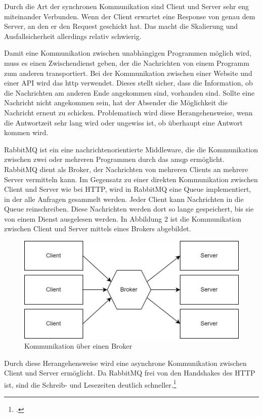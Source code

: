Durch die Art der synchronen Kommunikation sind Client und Server sehr eng miteinander Verbunden. Wenn der Client erwartet eine Response von genau dem Server, an den er den Request geschickt hat. Das macht die Skalierung und Ausfallsicherheit allerdings relativ schwierig.

Damit eine Kommunikation zwischen unabhängigen Programmen möglich wird, muss es einen Zwischendienst geben, der die Nachrichten von einem Programm zum anderen transportiert. Bei der Kommunikation zwischen einer Website und einer API wird das \ac{http} verwendet. Dieses stellt sicher, dass die Information, ob die Nachrichten am anderen Ende angekommen sind, vorhanden sind. Sollte eine Nachricht nicht angekommen sein, hat der Absender die Möglichkeit die Nachricht erneut zu schicken. Problematisch wird diese Herangehensweise, wenn die Antwortzeit sehr lang wird oder ungewiss ist, ob überhaupt eine Antwort kommen wird. 

RabbitMQ ist ein eine nachrichtenorientierte Middleware, die die Kommunikation zwischen zwei oder mehreren Programmen durch das \ac{amqp} ermöglicht. RabbitMQ dient als Broker, der Nachrichten von mehreren Clients an mehrere Server vermitteln kann. Im Gegensatz zu einer direkten Kommunikation zwischen Client und Server wie bei HTTP, wird in RabbitMQ eine Queue implementiert, in der alle Anfragen gesammelt werden. Jeder Client kann Nachrichten in die Queue reinschreiben. Diese Nachrichten werden dort so lange gespeichert, bis sie von einem Dienst ausgelesen werden. In Abbildung 2 ist die Kommunikation zwischen Client und Server mittels eines Brokers abgebildet.
 
\begin{figure}[H]
  \centering
    \includegraphics[width = 15cm]{bilder/Rabbit2}
    \caption{Kommunikation über einen Broker}
\end{figure}

Durch diese Herangehensweise wird eine asynchrone Kommunikation zwischen Client und Server ermöglicht. Da RabbitMQ frei von den Handshakes des HTTP ist, sind die Schreib- und Lesezeiten deutlich schneller.\footcite{ionescu2015analysis}

